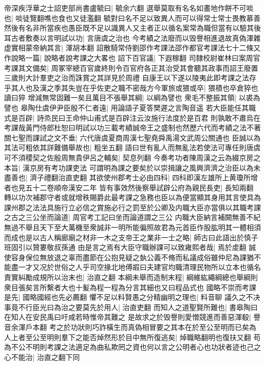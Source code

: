 帝深疾浮華之士詔吏部尚書盧毓曰|{
	毓余六翻}
選舉莫取有名名如畫地作餅不可啖也|{
	啖徒覽翻噍也食也又徒濫翻}
毓對曰名不足以致異人而可以得常士常士畏教慕善然後有名非所當疾也愚臣既不足以識異人又主者正以循名案常為職但當有以驗其後耳古者敷奏以言明試以功|{
	言唐虞之治也}
今考績之法廢而以毁譽相進退故真偽渾雜虚實相蒙帝納其言|{
	渾胡本翻}
詔散騎常侍劉邵作考課法邵作都官考課法七十二條又作說略一篇|{
	說略者說考課之大畧也}
詔下百官議|{
	下遐稼翻}
司隸校尉崔林曰案周官考課其文備矣|{
	周冢宰總百官歲終則令百官府各正其治受其會聽其政事而詔王廢置三歲則大計羣吏之治而誅賞之其詳見於周禮}
自康王以下遂以陵夷此即考課之法存乎其人也及漢之季其失豈在乎佐吏之職不密哉方今軍旅或猥或卒|{
	猥積也卒倉猝也讀曰猝}
增減無常固難一矣且萬目不張舉其綱|{
	以綱為譬也}
衆毛不整振其領|{
	以裘為譬也}
皋陶仕虞伊尹臣殷不仁者遠|{
	用論語子夏答樊遲之言陶音遥}
若大臣能任其職式是百辟|{
	詩烝民曰王命仲山甫式是百辟注云汝施行法度於是百君}
則孰敢不肅烏在考課哉黃門侍郎杜恕曰明試以功三載考績誠帝王之盛制也然歷六代而考績之法不著關七聖而課試之文不垂|{
	六代唐虞夏商周漢七聖堯舜禹湯文武周公關通也}
臣誠以為其法可粗依其詳難備舉故也|{
	粗坐五翻}
語曰世有亂人而無亂法若使法可專任則唐虞可不須稷契之佐殷周無貴伊呂之輔矣|{
	契息列翻}
今奏考功者陳周漢之云為綴京房之本旨|{
	漢京房有考功課吏法}
可謂明為課之要矣於以崇揖讓之風興濟濟之治臣以為未盡善也|{
	濟子禮翻治直吏翻}
其欲使州郡考士必由四科|{
	四科即漢左雄所上黄瓊所增者也見五十二卷順帝漢安二年}
皆有事效然後察舉試辟公府為親民長吏|{
	長知兩翻}
轉以功次補郡守者或就增秩賜爵此最考課之急務也臣以為便當顯其身用其言使具為課州郡之法法具施行立必信之賞施必行之罰至於公卿及内職大臣亦當俱以其職考課之古之三公坐而論道|{
	周官考工記曰坐而論道謂之三公}
内職大臣納言補闕無善不紀無過不舉且天下至大萬機至衆誠非一明所能徧照故君為元首臣作股肱明其一體相須而成也是以古人稱廊廟之材非一木之支帝王之業非一士之略|{
	師古曰此語出於慎子班固引以贊婁敬叔孫通}
由是言之焉有大臣守職辦課可以致雍熙者哉|{
	焉於䖍翻}
誠使容身保位無放退之辜而盡節在公抱見疑之埶公義不脩而私議成俗雖仲尼為課猶不能盡一才又况於世俗之人乎司空掾北地傅嘏曰夫建官均職清理民物所以立本也循名責實糾勵成規所以治末也|{
	治直之翻}
本綱未舉而造制末程|{
	綱維紘繩綱總也舉綱則衆目張矣言所繫者大也十髪為程一程為分言其細也又曰程品式也}
國略不崇而考課是先|{
	國略國經也先必薦翻}
懼不足以料賢愚之分精幽明之理也|{
	料音聊}
議久之不决事竟不行臣光曰為治之要莫先於用人|{
	治直吏翻}
而知人之道聖賢所難也|{
	書皋陶曰在知人在安民禹曰吁咸若時惟帝其難之}
是故求之於毁譽則愛憎競進而善惡渾殽|{
	譽音余渾戶本翻}
考之於功狀則巧詐橫生而真偽相冒要之其本在於至公至明而已矣為人上者至公至明則羣下之能否焯然形於目中無所復逃矣|{
	焯職略翻明也復扶又翻}
苟為不公不明則考課之法適足為曲私欺罔之資也何以言之公明者心也功狀者迹也己之心不能治|{
	治直之翻下同}
